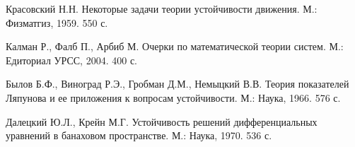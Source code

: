 \documentclass[12pt,a4paper,twoside]{article}  %
\begin{document}
\vspace{3ex}
\small
{ %

\renewcommand{\refname}{{\rm\centerline{СПИСОК ЛИТЕРАТУРЫ}}}

\begin{thebibliography}{99}



 Красовский Н.Н. Некоторые задачи теории устойчивости движения. М.: Физматгиз, 1959. 550 с.

 Калман Р., Фалб П., Арбиб М. Очерки по математической теории систем. М.: Едиториал УРСС, 2004. 400 с.

  Былов Б.Ф., Виноград Р.Э., Гробман Д.М., Немыцкий В.В. Теория показателей Ляпунова и ее приложения к вопросам устойчивости. М.: Наука, 1966. 576 с.

 Далецкий Ю.Л., Крейн М.Г. Устойчивость решений дифференциальных уравнений в банаховом пространстве. М.: Наука, 1970. 536 с.


\end{thebibliography}}
\end{document}

